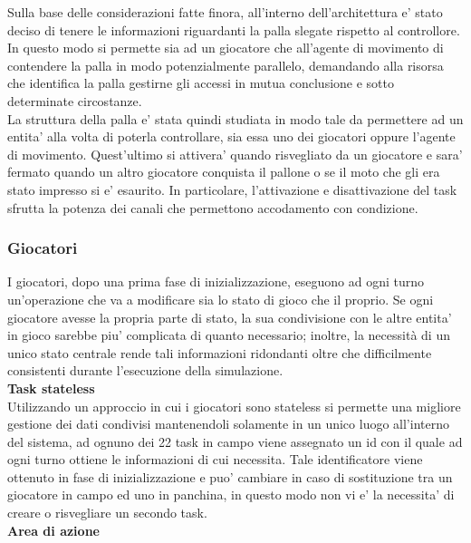 Sulla base delle considerazioni fatte finora, all'interno dell'architettura e' stato deciso di tenere le informazioni riguardanti la palla slegate rispetto al controllore. In questo modo si permette sia ad un giocatore che all'agente di movimento di contendere la palla in modo potenzialmente parallelo, demandando alla risorsa che identifica la palla gestirne gli accessi in mutua conclusione e sotto determinate circostanze.\\

La struttura della palla e' stata quindi studiata in modo tale da permettere ad un entita' alla volta di poterla controllare, sia essa uno dei giocatori oppure l'agente di movimento. Quest'ultimo si attivera' quando risvegliato da un giocatore e sara' fermato quando un altro giocatore conquista il pallone o se il moto che gli era stato impresso si e' esaurito. In particolare, l'attivazione e disattivazione del task sfrutta la potenza dei canali che permettono accodamento con condizione.

\subsubsection{Giocatori}
\label{sec:analisi_concorrenza_giocatori}

I giocatori, dopo una prima fase di inizializzazione, eseguono ad ogni turno un'operazione che va a modificare sia lo stato di gioco che il proprio. Se ogni giocatore avesse la propria parte di stato, la sua condivisione con le altre entita' in gioco sarebbe piu' complicata di quanto necessario; inoltre, la necessità di un unico stato centrale rende tali informazioni ridondanti oltre che difficilmente consistenti durante l'esecuzione della simulazione.\\

\textbf{Task stateless}\\

Utilizzando un approccio in cui i giocatori sono stateless si permette una migliore gestione dei dati condivisi mantenendoli solamente in un unico luogo all'interno del sistema, ad ognuno dei 22 task in campo viene assegnato un id con il quale ad ogni turno ottiene le informazioni di cui necessita. Tale identificatore viene ottenuto in fase di inizializzazione e puo' cambiare in caso di sostituzione tra un giocatore in campo ed uno in panchina, in questo modo non vi e' la necessita' di creare o risvegliare un secondo task.\\

\textbf{Area di azione}\\

